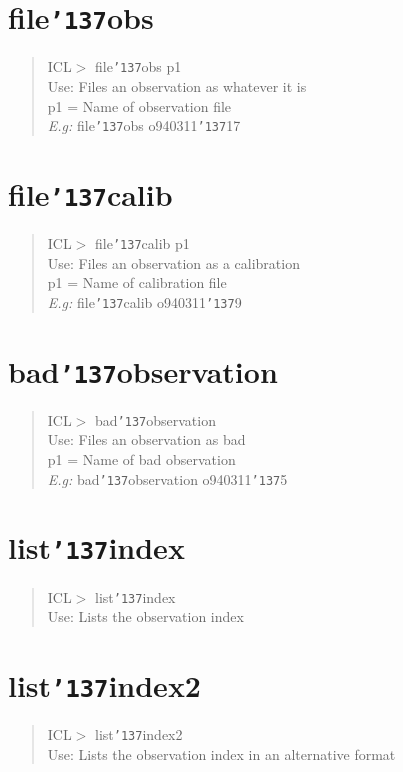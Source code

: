 \documentclass[a4paper]{book}
\renewcommand{\_}{{\tt\char'137}}
\begin{document}
\section{file\_obs}
\begin{quote}
ICL$>$ file\_obs p1 \\
Use: Files an observation as whatever it is \\
p1 = Name of observation file \\
{\em E.g:} file\_obs o940311\_17
\end{quote}
\section{file\_calib}
\begin{quote}
ICL$>$ file\_calib p1 \\
Use: Files an observation as a calibration \\
p1 = Name of calibration file \\
{\em E.g:} file\_calib o940311\_9
\end{quote}
\section{bad\_observation}
\begin{quote}
ICL$>$ bad\_observation \\
Use: Files an observation as bad \\
p1 = Name of bad observation \\
{\em E.g:} bad\_observation o940311\_5
\end{quote}
\section{list\_index}
\begin{quote}
ICL$>$ list\_index \\
Use: Lists the observation index
\end{quote}
\section{list\_index2}
\begin{quote}
ICL$>$ list\_index2 \\
Use: Lists the observation index in an alternative format
\end{quote}
\end{document}
